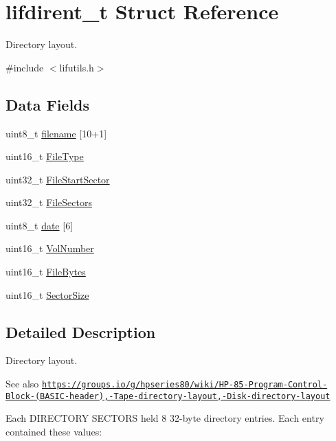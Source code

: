 \hypertarget{structlifdirent__t}{}\section{lifdirent\+\_\+t Struct Reference}
\label{structlifdirent__t}


Directory layout.  




{\ttfamily \#include $<$lifutils.\+h$>$}

\subsection*{Data Fields}
\begin{DoxyCompactItemize}
\item 
uint8\+\_\+t \hyperlink{structlifdirent__t_ac0d5353d2e81494997b15597377de032}{filename} \mbox{[}10+1\mbox{]}
\item 
uint16\+\_\+t \hyperlink{structlifdirent__t_a48901a6b2b10471927397b3b569e386a}{File\+Type}
\item 
uint32\+\_\+t \hyperlink{structlifdirent__t_a87df04d1aa76daa4b9500f2f2e44ecaa}{File\+Start\+Sector}
\item 
uint32\+\_\+t \hyperlink{structlifdirent__t_a635a8963789282e49acda98839c7d9b3}{File\+Sectors}
\item 
uint8\+\_\+t \hyperlink{structlifdirent__t_a6ef6cc281858e9d0de62c6a9ab5b432e}{date} \mbox{[}6\mbox{]}
\item 
uint16\+\_\+t \hyperlink{structlifdirent__t_a9510c4f024400cff22c8abb54a4aca65}{Vol\+Number}
\item 
uint16\+\_\+t \hyperlink{structlifdirent__t_a66e5f440e3a192df59c623faa2d01dbd}{File\+Bytes}
\item 
uint16\+\_\+t \hyperlink{structlifdirent__t_a4c2a8fab6d73c7f1baa502c1ebef8658}{Sector\+Size}
\end{DoxyCompactItemize}


\subsection{Detailed Description}
Directory layout. 

\begin{DoxySeeAlso}{See also}
\href{https://groups.io/g/hpseries80/wiki/HP-85-Program-Control-Block-(BASIC-header),-Tape-directory-layout,-Disk-directory-layout}{\tt https\+://groups.\+io/g/hpseries80/wiki/\+H\+P-\/85-\/\+Program-\/\+Control-\/\+Block-\/(\+B\+A\+S\+I\+C-\/header),-\/\+Tape-\/directory-\/layout,-\/\+Disk-\/directory-\/layout}
\end{DoxySeeAlso}
Each D\+I\+R\+E\+C\+T\+O\+RY S\+E\+C\+T\+O\+RS held 8 32-\/byte directory entries. Each entry contained these values\+:

